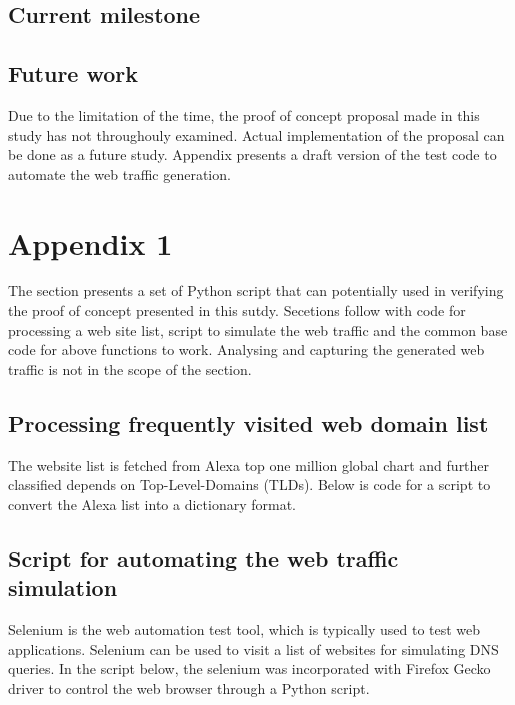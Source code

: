 \documentclass[a4paper,12pt]{article}
\begin{document}
\subsection{Current milestone}

\subsection{Future work}
Due to the limitation of the time, the proof of concept proposal made in this study has not throughouly examined. Actual implementation of the proposal can be done as a future study. Appendix presents a draft version of the test code to automate the web traffic generation.
\newpage


%
\newpage

\hypersetup{urlcolor=black}


\newpage
\setcounter{page}{1} %
\appendix

\section{Appendix 1}\label{scriptcode-appendix}
The section presents a set of Python script that can potentially used in verifying the proof of concept presented in this sutdy.
Secetions follow with code for processing a web site list, script to simulate the web traffic and the common base code for above functions to work.
Analysing and capturing the generated web traffic is not in the scope of the section.

\subsection{Processing frequently visited web domain list} \label{processweblist}
The website list is fetched from Alexa top one million global chart and further classified depends on Top-Level-Domains (TLDs).
Below is code for a script to convert the Alexa list into a dictionary format.

\subsection{Script for automating the web traffic simulation}
Selenium is the web automation test tool\cite{holmes2006automating}, which is typically used to test web applications. Selenium can be used to visit a list of websites for simulating DNS queries. In the script below, the selenium was incorporated with Firefox Gecko driver to control the web browser through a Python script.
\end{document}
